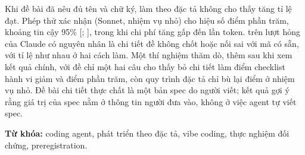 Khi đề bài đã nêu đủ tên và chữ ký, làm theo đặc tả không cho thấy tăng tỉ lệ đạt. Phép thử xác nhận (Sonnet,
nhiệm vụ nhỏ) cho hiệu số \NumResHOneEstPp{} điểm phần trăm, khoảng tin cậy 95\%
[\NumResHOneLowPp{}; \NumResHOneHighPp{}], trong khi chi phí tăng gấp \NumResTokenRatioMin{} đến
\NumResTokenRatioMax{} lần token. \NumLabOutside{} trên \NumLabRuns{} lượt hỏng của Claude có nguyên nhân là
chi tiết đề không chốt hoặc nối sai với mã có sẵn, với tỉ lệ như nhau ở hai cách làm. Một thí nghiệm thăm dò, thêm sau khi xem kết quả chính,
với đề chỉ một hai câu cho thấy bỏ chi tiết làm điểm checklist hành vi giảm \NumETwoXScoreShiftSpec{} và
\NumETwoXScoreShiftVibe{} điểm phần trăm, còn quy trình đặc tả chỉ bù lại \NumETwoPooledSmallPp{} điểm ở
nhiệm vụ nhỏ. Đề bài chi tiết thực chất là một bản spec do người viết; kết quả gợi ý rằng giá trị của spec
nằm ở thông tin người đưa vào, không ở việc agent tự viết spec.

\textbf{Từ khóa:} coding agent, phát triển theo đặc tả, vibe coding, thực nghiệm đối chứng, preregistration.

\clearpage
\tableofcontents
